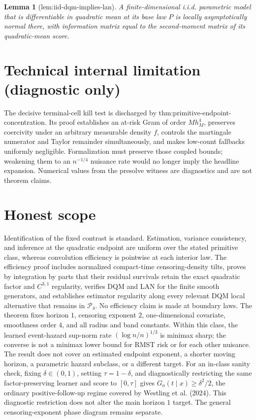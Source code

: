\documentclass{article}
\newtheorem{lemma}{Lemma}
\begin{document}
\begin{lemma}[lem:iid-dqm-implies-lan]\label{lem:iid-dqm-implies-lan}
A finite-dimensional i.i.d. parametric model that is differentiable in quadratic mean at its base law \(P\) is locally asymptotically normal there, with information matrix equal to the second-moment matrix of its quadratic-mean score.
\end{lemma}

\section*{Technical internal limitation (diagnostic only)}

The decisive terminal-cell kill test is discharged by thm:primitive-endpoint-concentration. Its proof establishes an at-risk Gram of order \(Mh_M^4\), preserves coercivity under an arbitrary measurable density \(f\), controls the martingale numerator and Taylor remainder simultaneously, and makes low-count fallbacks uniformly negligible. Formalization must preserve those coupled bounds; weakening them to an \(n^{-1/4}\) nuisance rate would no longer imply the headline expansion. Numerical values from the presolve witness are diagnostics and are not theorem claims.

\section{Honest scope}

Identification of the fixed contrast is standard. Estimation, variance consistency, and inference at the quadratic endpoint are uniform over the stated primitive class, whereas convolution efficiency is pointwise at each interior law. The efficiency proof includes normalized compact-time censoring-density tilts, proves by integration by parts that their residual survivals retain the exact quadratic factor and \(C^{3,1}\) regularity, verifies DQM and LAN for the finite smooth generators, and establishes estimator regularity along every relevant DQM local alternative that remains in \(\mathcal P_4\). No efficiency claim is made at boundary laws. The theorem fixes horizon \(1\), censoring exponent \(2\), one-dimensional covariate, smoothness order \(4\), and all radius and band constants. Within this class, the learned event-hazard sup-norm rate \((\log n/n)^{1/3}\) is minimax sharp; the converse is not a minimax lower bound for RMST risk or for each other nuisance. The result does not cover an estimated endpoint exponent, a shorter moving horizon, a parametric hazard subclass, or a different target. For an in-class sanity check, fixing \(\delta\in(0,1)\), setting \(\tau=1-\delta\), and diagnostically restricting the same factor-preserving learner and score to \([0,\tau]\) gives \(G_a(t\mid x)\ge\delta^2/2\), the ordinary positive-follow-up regime covered by Westling et al. (2024). This diagnostic restriction does not alter the main horizon \(1\) target. The general censoring-exponent phase diagram remains separate.
\end{document}
